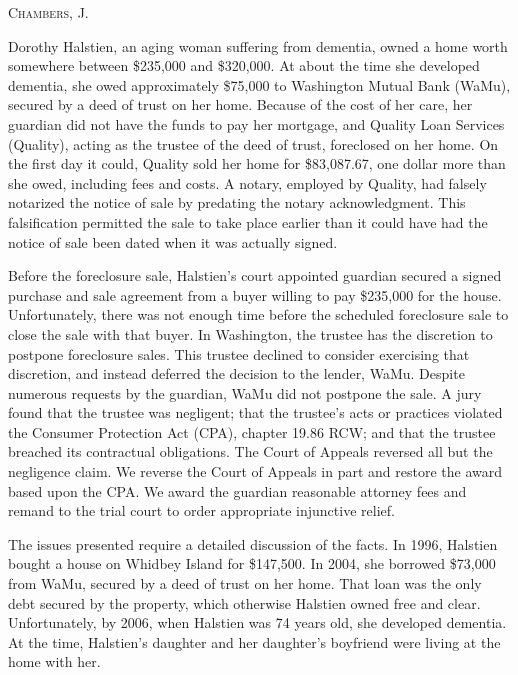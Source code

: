 

\opinion \textsc{Chambers}, J.

Dorothy Halstien, an aging woman suffering from dementia, owned a home
worth somewhere between \$235,000 and \$320,000. At about the time she
developed dementia, she owed approximately \$75,000 to Washington Mutual Bank
(WaMu), secured by a deed of trust
on her home. Because of the cost of her
care, her guardian did not have the funds to pay her mortgage, and Quality Loan
Services (Quality), acting as the trustee of the deed of trust, foreclosed on
her home. On the first day it could, Quality sold her home for \$83,087.67, one
dollar more than she owed, including fees and costs. A notary, employed by
Quality, had falsely notarized the notice of sale by predating the notary
acknowledgment. This falsification permitted the sale to take place earlier
than it could have had the notice of sale been dated when it was actually
signed.

Before the foreclosure sale, Halstien's court appointed guardian secured
a signed purchase and sale agreement from a buyer willing to pay \$235,000 for
the house. Unfortunately, there was not enough time before the scheduled
foreclosure sale to close the sale with that buyer. In Washington, the trustee
has the discretion to postpone foreclosure sales. This trustee declined to
consider exercising that discretion, and instead deferred the decision to the
lender, WaMu. Despite numerous requests by the guardian, WaMu did not postpone
the sale. A jury found that the trustee was negligent; that the trustee's acts
or practices violated the Consumer Protection Act (CPA), chapter 19.86 RCW; and
that the trustee breached its contractual obligations. The Court of Appeals
reversed all but the negligence claim. We reverse the Court of Appeals in part
and restore the award based upon the CPA. We award the guardian reasonable
attorney fees and remand to the trial court to order appropriate injunctive
relief.


The issues presented require a detailed discussion of the facts. In 1996,
Halstien bought a house on Whidbey Island for \$147,500. In 2004, she borrowed
\$73,000 from WaMu, secured by a deed of trust on her home. That loan was the
only debt secured by the property, which otherwise Halstien owned free and
clear. Unfortunately, by 2006, when Halstien was 74 years old, she developed
dementia. At the time, Halstien's daughter and her daughter's boyfriend were
living at the home with her.

